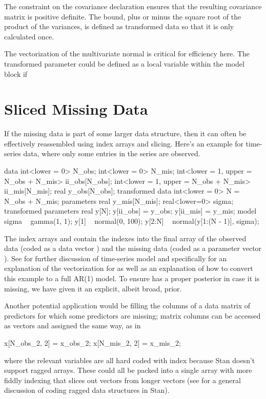 The constraint on the covariance declaration ensures that the
resulting covariance matrix  is positive definite.  The
bound, plus or minus the square root of the product of the variances,
is defined as transformed data so that it is only calculated once.

The vectorization of the multivariate normal is critical for
efficiency here.  The transformed parameter  could be
defined as a local variable within the model block if 

\section{Sliced Missing Data}

If the missing data is part of some larger data structure, then it can
often be effectively reassembled using index arrays and slicing.
Here's an example for time-series data, where only some entries in the
series are observed. 
%
\begin{stancode}
data {
  int<lower = 0> N_obs;
  int<lower = 0> N_mis;
  int<lower = 1, upper = N_obs + N_mis> ii_obs[N_obs];
  int<lower = 1, upper = N_obs + N_mis> ii_mis[N_mis];
  real y_obs[N_obs];
}
transformed data {
  int<lower = 0> N = N_obs + N_mis;
}
parameters {
  real y_mis[N_mis];
  real<lower=0> sigma;
}
transformed parameters {
  real y[N];
  y[ii_obs] = y_obs;
  y[ii_mis] = y_mis;
}
model {
  sigma ~ gamma(1, 1);
  y[1] ~ normal(0, 100);
  y[2:N] ~ normal(y[1:(N - 1)], sigma);
}
\end{stancode}
%
The index arrays  and  contain the indexes
into the final array  of the observed data (coded as a data
vector ) and the missing data (coded as a parameter
vector ).  See  for further
discussion of time-series model and specifically
 for an explanation of the vectorization
for  as well as an explanation of how to convert this example
to a full AR(1) model.  To ensure  has a proper posterior
in case it is missing, we have given it an explicit, albeit broad,
prior.

Another potential application would be filling the
columns of a data matrix of predictors for which some predictors are
missing; matrix columns can be accessed as vectors and assigned the
same way, as in
%
\begin{stancode}
  x[N_obs_2, 2] = x_obs_2;
  x[N_mis_2, 2] = x_mis_2;
\end{stancode}
%
where the relevant variables are all hard coded with index 
because Stan doesn't support ragged arrays.  These could all be packed
into a single array with more fiddly indexing that slices out vectors
from longer vectors (see  for a
general discussion of coding ragged data structures in Stan).

